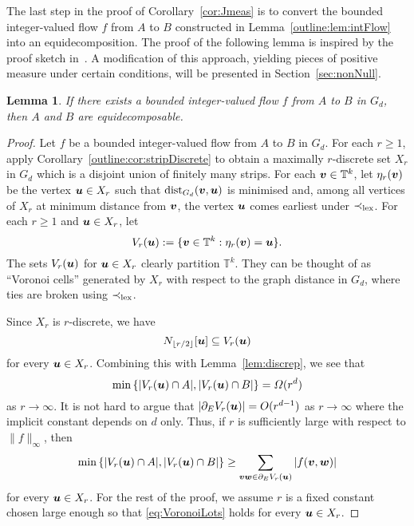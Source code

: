 \documentclass[12pt,a4paper]{amsart}
\numberwithin{equation}{section}
\newtheorem{lemma}[equation]{Lemma}
\theoremstyle{definition}
\begin{document}
The last step in the proof of Corollary~\ref{cor:Jmeas} is to convert the bounded integer-valued flow $f$ from $A$ to $B$ constructed in Lemma~\ref{outline:lem:intFlow} into an equidecomposition. The proof of the following lemma is inspired by the proof sketch in~\cite[Remark~6.2]{MarksUnger17}. A modification of this approach, yielding pieces of positive measure under certain conditions, will be presented in Section~\ref{sec:nonNull}.

\begin{lemma}
\label{outline:lem:matching}
If there exists a bounded integer-valued flow $f$ from $A$ to $B$ in $G_d$, then $A$ and $B$ are equidecomposable. 
\end{lemma}

\begin{proof}
Let $f$ be a bounded integer-valued flow from $A$ to $B$ in $G_d$. For each $r\geq1$, apply Corollary~\ref{outline:cor:stripDiscrete} to obtain a maximally $r$-discrete set $X_r$ in $G_d$ which is a disjoint union of finitely many strips. For each $\boldsymbol{v}\in \mathbb{T}^k$, let $\eta_r(\boldsymbol{v})$ be the vertex $\boldsymbol{u}\in X_r$  such that $\operatorname{dist}_{G_d}(\boldsymbol{v},\boldsymbol{u})$ is minimised and, among all vertices of $X_r$ at minimum distance from $\boldsymbol{v}$, the vertex $\boldsymbol{u}$ comes earliest under $\prec_{\operatorname{lex}}$. For each $r\geq1$ and $\boldsymbol{u}\in X_r$, let
\[V_r(\boldsymbol{u}):=\{\boldsymbol{v}\in\mathbb{T}^k: \eta_r(\boldsymbol{v})=\boldsymbol{u}\}.\]
The sets $V_r(\boldsymbol{u})$ for $\boldsymbol{u}\in X_r$ clearly partition $\mathbb{T}^k$. They can be thought of as ``Voronoi cells'' generated by $X_r$ with respect to the graph distance in $G_d$, where ties are broken using $\prec_{\operatorname{lex}}$. 

Since $X_r$ is $r$-discrete, we have
\[N_{\lfloor r/2\rfloor}[\boldsymbol{u}]\subseteq V_r(\boldsymbol{u})\]
for every $\boldsymbol{u}\in X_r$. Combining this with Lemma~\ref{lem:discrep}, we see that
\[\min\left\{|V_r(\boldsymbol{u})\cap A|,|V_r(\boldsymbol{u})\cap B|\right\} = \Omega(r^d)\]
as $r\to \infty$. It is not hard to argue that $\left|\partial_EV_r(\boldsymbol{u})\right| = O(r^{d-1})$ as $r\to\infty$ where the implicit constant depends on $d$ only. Thus, if $r$ is sufficiently large with respect to $\|f\|_\infty$, then 
\begin{equation}\label{eq:VoronoiLots}\min\left\{|V_r(\boldsymbol{u})\cap A|,|V_r(\boldsymbol{u})\cap B|\right\} \geq \sum_{\boldsymbol{v}\boldsymbol{w}\in \partial_EV_r(\boldsymbol{u})}|f(\boldsymbol{v},\boldsymbol{w})|\end{equation}
for every $\boldsymbol{u}\in X_r$. For the rest of the proof, we assume $r$ is a fixed constant chosen large enough so that \eqref{eq:VoronoiLots} holds for every $\boldsymbol{u}\in X_r$.


\end{proof}
\end{document}
